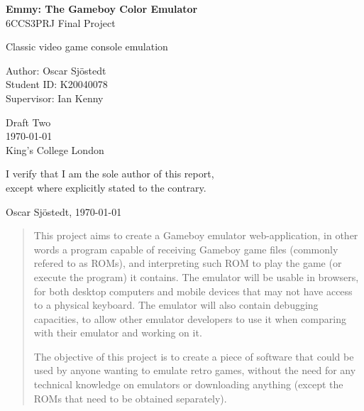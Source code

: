 \documentclass[11pt]{report}
\begin{document}

\begin{titlepage}
    \begin{center}
        \vspace*{1cm}

        \Huge
        \textbf{Emmy: The Gameboy Color Emulator}\\
        6CCS3PRJ Final Project

        \vspace{1.5cm}
        \Large
        Classic video game console emulation

        \vfill

        Author: Oscar Sjöstedt\\
        Student ID: K20040078\\
        Supervisor: Ian Kenny

        \vspace{1.5cm}

        \Large
        Draft Two \\
        \today \\
        King's College London \\

    \end{center}
\end{titlepage}

\null\vfill

\clearpage

\vspace*{\fill}
\begin{center}
	I verify that I am the sole author of this report, \\
	except where explicitly stated  to the contrary.
	
	Oscar Sjöstedt, \today
\end{center}
\vspace*{\fill}

\begin{abstract}
    This project aims to create a Gameboy emulator web-application, in other words a program capable of receiving Gameboy game files (commonly refered to as ROMs), and interpreting such ROM to play the game (or execute the program) it contains. The emulator will be usable in browsers, for both desktop computers and mobile devices that may not have access to a physical keyboard. The emulator will also contain debugging capacities, to allow other emulator developers to use it when comparing with their emulator and working on it.

    The objective of this project is to create a piece of software that could be used by anyone wanting to emulate retro games, without the need for any technical knowledge on emulators or downloading anything (except the ROMs that need to be obtained separately).
\end{abstract}
\vfill
\end{document}
